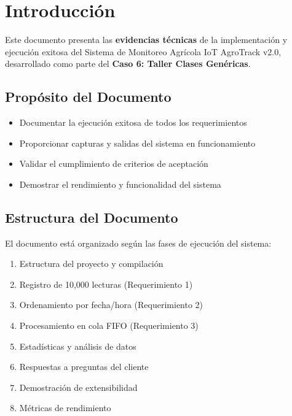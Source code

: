 \documentclass[12pt,a4paper]{article}
\begin{document}

\tableofcontents
\newpage

\setcounter{page}{1}


\section{Introducción}

Este documento presenta las \textbf{evidencias técnicas} de la implementación y ejecución exitosa del Sistema de Monitoreo Agrícola IoT AgroTrack v2.0, desarrollado como parte del \textbf{Caso 6: Taller Clases Genéricas}.

\subsection{Propósito del Documento}

\begin{itemize}
    \item Documentar la ejecución exitosa de todos los requerimientos
    \item Proporcionar capturas y salidas del sistema en funcionamiento
    \item Validar el cumplimiento de criterios de aceptación
    \item Demostrar el rendimiento y funcionalidad del sistema
\end{itemize}

\subsection{Estructura del Documento}

El documento está organizado según las fases de ejecución del sistema:

\begin{enumerate}
    \item Estructura del proyecto y compilación
    \item Registro de 10,000 lecturas (Requerimiento 1)
    \item Ordenamiento por fecha/hora (Requerimiento 2)
    \item Procesamiento en cola FIFO (Requerimiento 3)
    \item Estadísticas y análisis de datos
    \item Respuestas a preguntas del cliente
    \item Demostración de extensibilidad
    \item Métricas de rendimiento
\end{enumerate}
\end{document}
